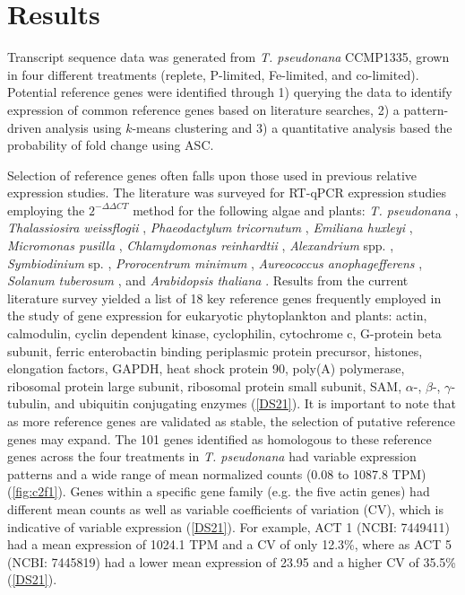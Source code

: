 \section{Results}
Transcript sequence data was generated from \textit{T. pseudonana} CCMP1335, grown in four different treatments (replete, P-limited, Fe-limited, and co-limited). Potential reference genes were identified through 1) querying the data to identify expression of common reference genes based on literature searches, 2) a pattern-driven analysis using $k$-means clustering \citep{Hartigan1979} and 3) a quantitative analysis based the probability of fold change using ASC. \par
Selection of reference genes often falls upon those used in previous relative expression studies. The literature was surveyed for RT-qPCR expression studies employing the $2^{- \Delta \Delta CT}$ method for the following algae and plants: \textit{T. pseudonana} \citep{Maldonado2006, McGinn2008, McGinn2008a, Mock2008, Park2008, Carvalho2011, Whitney2011a}, \textit{Thalassiosira weissflogii} \citep{Davis2006, McGinn2008, Park2008, Whitney2011a}, \textit{Phaeodactylum tricornutum} \citep{Siaut2007, McGinn2008}, \textit{Emiliana huxleyi} \citep{Bruhn2010, Richier2011}, \textit{Micromonas pusilla} \citep{McDonald2010}, \textit{Chlamydomonas reinhardtii} \citep{Moseley2006, Zhao2009}, \textit{Alexandrium} spp. \citep{Lee2009, Moustafa2010}, \textit{Symbiodinium} sp. \citep{Rosic2010, Rosic2010a, Leggat2011}, \textit{Prorocentrum minimum} \citep{Guo2012}, \textit{Aureococcus anophagefferens} \citep{Berg2008, Wurch2011}, \textit{Solanum tuberosum} \citep{Nicot2005}, and \textit{Arabidopsis thaliana} \citep{Avonce2004}. Results from the current literature survey yielded a list of 18 key reference genes frequently employed in the study of gene expression for eukaryotic phytoplankton and plants: actin, calmodulin, cyclin dependent kinase, cyclophilin, cytochrome c, G-protein beta subunit, ferric enterobactin binding periplasmic protein precursor, histones, elongation factors, GAPDH, heat shock protein 90, poly(A) polymerase, ribosomal protein large subunit, ribosomal protein small subunit, SAM, $\alpha$-, $\beta$-, $\gamma$-tubulin, and ubiquitin conjugating enzymes (\ref{DS21}). It is important to note that as more reference genes are validated as stable, the selection of putative reference genes may expand. The 101 genes identified as homologous to these reference genes across the four treatments in \textit{T. pseudonana} had variable expression patterns and a wide range of mean normalized counts (0.08 to 1087.8 TPM) (\cref{fig:c2f1}). Genes within a specific gene family (e.g. the five actin genes) had different mean counts as well as variable coefficients of variation (CV), which is indicative of variable expression (\ref{DS21}). For example, ACT 1 (NCBI: 7449411) had a mean expression of 1024.1 TPM and a CV of only 12.3\%, where as ACT 5 (NCBI: 7445819) had a lower mean expression of 23.95 and a higher CV of 35.5\% (\ref{DS21}). \par


